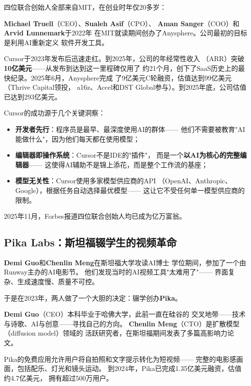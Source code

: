 四位联合创始人全部来自MIT，在创业时年仅20多岁：

\textbf{Michael Truell}（CEO）、\textbf{Sualeh Asif}（CPO）、
\textbf{Aman Sanger}（COO）和\textbf{Arvid Lunnemark}于2022年
在MIT就读期间创办了Anysphere。公司最初的目标是利用AI重新定义
软件开发工具。

Cursor于2023年发布后迅速走红。到2025年，公司的年经常性收入
（ARR）突破\textbf{10亿美元}——从发布到达到这一里程碑仅用了
约21个月，创下了SaaS历史上的最快纪录。2025年6月，Anysphere完成
了9亿美元C轮融资，估值达到99亿美元（Thrive Capital领投，
a16z、Accel和DST Global参与）。到2025年底，公司估值
已达到293亿美元。

\begin{corebox}[四位MIT学生如何创造SaaS历史？]
Cursor的成功源于几个关键洞察：
\begin{itemize}
  \item \textbf{开发者先行}：程序员是最早、最深度使用AI的群体——
    他们不需要被教育"AI能做什么"，因为他们每天都在使用模型；
  \item \textbf{编辑器即操作系统}：Cursor不是IDE的"插件"，
    而是一个\textbf{以AI为核心的完整编辑器}——
    这使得AI辅助不是锦上添花，而是整个工作流的基座；
  \item \textbf{模型无关性}：Cursor使用多家模型供应商的API
    （OpenAI、Anthropic、Google），根据任务自动选择最优模型——
    这让它不受任何单一模型供应商的限制。
\end{itemize}
2025年11月，Forbes报道四位联合创始人均已成为亿万富翁。
\end{corebox}

\subsection{Pika Labs：斯坦福辍学生的视频革命}

\textbf{Demi Guo}和\textbf{Chenlin Meng}在斯坦福大学攻读AI博士
学位期间，参加了一个由Runway主办的AI电影节。
他们发现当时的AI视频工具"太难用了"——
界面复杂、生成速度慢、质量不可控。

于是在2023年，两人做了一个大胆的决定：辍学创办\textbf{Pika}。

\textbf{Demi Guo}（CEO）本科毕业于哈佛大学，此前一直在硅谷的
交叉地带——技术与诗歌、AI与创意——寻找自己的方向。
\textbf{Chenlin Meng}（CTO）是扩散模型（diffusion model）领域的
活跃研究者，在斯坦福期间发表了多篇高影响力论文。

Pika的免费应用允许用户将自拍照和文字提示转化为短视频——
完整的电影感画面，包括配乐、灯光和镜头运动。
到2024年，Pika已完成1.35亿美元融资，估值约4.7亿美元，
拥有超过500万用户。


